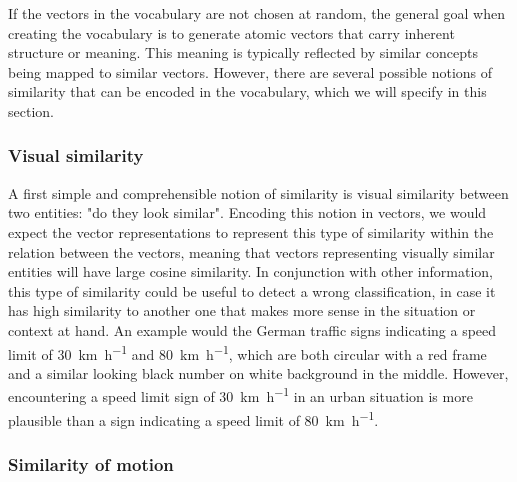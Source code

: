 If the vectors in the vocabulary are not chosen at random, the general goal when creating the vocabulary is to generate atomic vectors that carry inherent structure or meaning.
This meaning is typically reflected by similar concepts being mapped to similar vectors.
However, there are several possible notions of similarity that can be encoded in the vocabulary, which we will specify in this section.

\subsubsection{Visual similarity}%
\label{ssubsec:visual_similarity}

A first simple and comprehensible notion of similarity is visual similarity between two entities: "do they look similar". 
Encoding this notion in vectors, we would expect the vector representations to represent this type of similarity within the relation between the vectors, meaning that vectors representing visually similar entities will have large cosine similarity.
In conjunction with other information, this type of similarity could be useful to detect a wrong classification, in case it has high similarity to another one that makes more sense in the situation or context at hand.
An example would the German traffic signs indicating a speed limit of \SI[per-mode=symbol]{30}{\kilo\meter\per\hour} and \SI[per-mode=symbol]{80}{\kilo\meter\per\hour}, which are both circular with a red frame and a similar looking black number on white background in the middle.
However, encountering a speed limit sign of \SI[per-mode=symbol]{30}{\kilo\meter\per\hour} in an urban situation is more plausible than a sign indicating a speed limit of \SI[per-mode=symbol]{80}{\kilo\meter\per\hour}.

\subsubsection{Similarity of motion}%
\label{ssubsec:similarity_of_motion}

